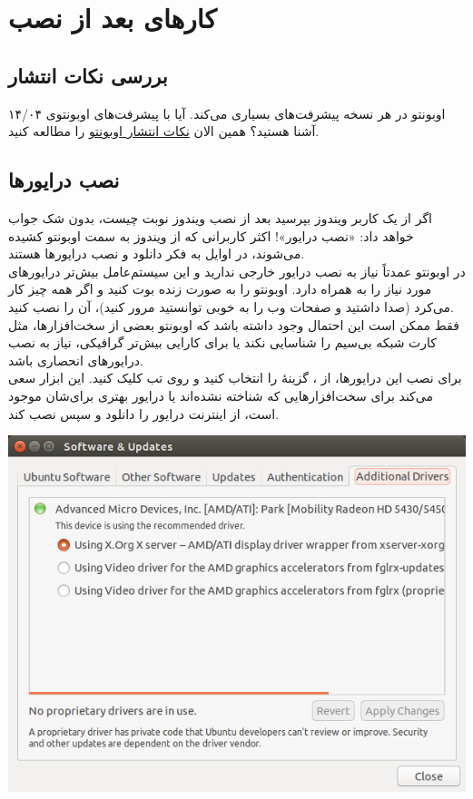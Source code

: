 \chapter{کارهای بعد از نصب}
\section{بررسی نکات انتشار}
 اوبونتو در هر نسخه پیشرفت‌های بسیاری می‌کند. آیا با پیشرفت‌های اوبونتوی ۱۴/۰۴ آشنا هستید؟ همین الان \href{https://wiki.ubuntu.com/TrustyTahr/ReleaseNotes}{نکات انتشار اوبونتو} را مطالعه کنید.


\section{نصب درایورها}
اگر از یک کاربر ویندوز بپرسید بعد از نصب ویندوز نوبت چیست، بدون شک جواب خواهد داد: «نصب درایور»! اکثر کاربرانی که از ویندوز به سمت اوبونتو کشیده می‌شوند، در اوایل به فکر دانلود و نصب درایورها هستند.\\
در اوبونتو عمدتاً نیاز به نصب درایور خارجی ندارید و این سیستم‌عامل بیش‌تر درایورهای مورد نیاز را به همراه دارد. اوبونتو را به صورت زنده بوت کنید و اگر همه چیز کار می‌کرد (صدا داشتید و صفحات وب را به خوبی توانستید مرور کنید)، آن را نصب کنید.\\
فقط ممکن است این احتمال وجود داشته باشد که اوبونتو بعضی از سخت‌افزارها، مثل کارت شبکه بی‌سیم را شناسایی نکند یا برای کارایی بیش‌تر گرافیکی، نیاز به نصب درایورهای انحصاری باشد.\\
برای نصب این درایورها، از ، گزینهٔ  را انتخاب کنید و روی تب  کلیک کنید. این ابزار سعی می‌کند برای سخت‌افزارهایی که شناخته نشده‌اند یا درایور بهتری برای‌شان موجود است، از اینترنت درایور را دانلود و سپس نصب کند.

\begin{center}
\includegraphics[scale=0.5]{pics/28.png}
\end{center}

